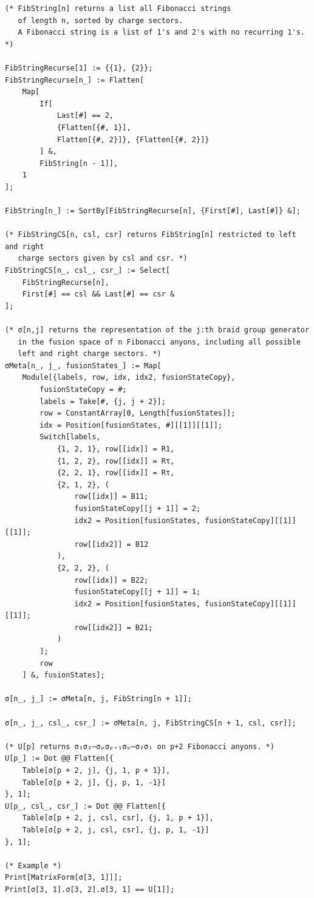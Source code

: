 \documentclass[a4paper,10pt,oneside]{book}
\theoremstyle{plain}
\theoremstyle{definition}
\theoremstyle{remark}
\begin{document}
\begin{verbatim}
(* FibString[n] returns a list all Fibonacci strings
   of length n, sorted by charge sectors.
   A Fibonacci string is a list of 1's and 2's with no recurring 1's. *)

FibStringRecurse[1] := {{1}, {2}};
FibStringRecurse[n_] := Flatten[
    Map[
        If[
            Last[#] == 2,
            {Flatten[{#, 1}],
            Flatten[{#, 2}]}, {Flatten[{#, 2}]}
        ] &,
        FibString[n - 1]],
    1
];

FibString[n_] := SortBy[FibStringRecurse[n], {First[#], Last[#]} &];

(* FibStringCS[n, csl, csr] returns FibString[n] restricted to left and right
   charge sectors given by csl and csr. *)
FibStringCS[n_, csl_, csr_] := Select[
    FibStringRecurse[n],
    First[#] == csl && Last[#] == csr &
];

(* σ[n,j] returns the representation of the j:th braid group generator
   in the fusion space of n Fibonacci anyons, including all possible
   left and right charge sectors. *)
σMeta[n_, j_, fusionStates_] := Map[
    Module[{labels, row, idx, idx2, fusionStateCopy},
        fusionStateCopy = #;
        labels = Take[#, {j, j + 2}];
        row = ConstantArray[0, Length[fusionStates]];
        idx = Position[fusionStates, #][[1]][[1]];
        Switch[labels,
            {1, 2, 1}, row[[idx]] = R1,
            {1, 2, 2}, row[[idx]] = Rτ,
            {2, 2, 1}, row[[idx]] = Rτ,
            {2, 1, 2}, (
                row[[idx]] = B11;
                fusionStateCopy[[j + 1]] = 2;
                idx2 = Position[fusionStates, fusionStateCopy][[1]][[1]];
                row[[idx2]] = B12
            ),
            {2, 2, 2}, (
                row[[idx]] = B22;
                fusionStateCopy[[j + 1]] = 1;
                idx2 = Position[fusionStates, fusionStateCopy][[1]][[1]];
                row[[idx2]] = B21;
            )
        ];
        row
    ] &, fusionStates];

σ[n_, j_] := σMeta[n, j, FibString[n + 1]];

σ[n_, j_, csl_, csr_] := σMeta[n, j, FibStringCS[n + 1, csl, csr]];

(* U[p] returns σ₁σ₂⋯σₚσₚ₊₁σₚ⋯σ₂σ₁ on p+2 Fibonacci anyons. *)
U[p_] := Dot @@ Flatten[{
    Table[σ[p + 2, j], {j, 1, p + 1}],
    Table[σ[p + 2, j], {j, p, 1, -1}]
}, 1];
U[p_, csl_, csr_] := Dot @@ Flatten[{
    Table[σ[p + 2, j, csl, csr], {j, 1, p + 1}],
    Table[σ[p + 2, j, csl, csr], {j, p, 1, -1}]
}, 1];

(* Example *)
Print[MatrixForm[σ[3, 1]]];
Print[σ[3, 1].σ[3, 2].σ[3, 1] == U[1]];
\end{verbatim}
\end{document}
